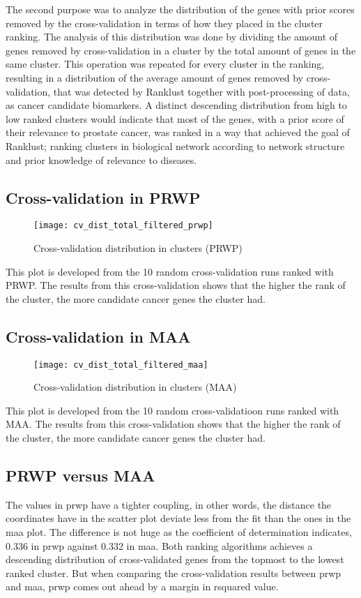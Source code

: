 The second purpose was to analyze the distribution of the genes with prior
scores removed by the cross-validation in terms of how they placed in the
cluster ranking. The analysis of this distribution was done by dividing the
amount of genes removed by cross-validation in a cluster by the total amount of
genes in the same cluster. This operation was repeated for every cluster in the
ranking, resulting in a distribution of the average amount of genes removed by
cross-validation, that was detected by Ranklust together with post-processing of
data, as cancer candidate biomarkers. A distinct descending distribution from
high to low ranked clusters would indicate that most of the genes, with a prior
score of their relevance to prostate cancer, was ranked in a way that achieved
the goal of Ranklust; ranking clusters in biological network according to
network structure and prior knowledge of relevance to diseases.

\subsection{Cross-validation in PRWP}
\begin{figure}[H]
    \label{fig:irefweb-prwp}
    \texttt{[image: cv\_dist\_total\_filtered\_prwp]}
    \caption{Cross-validation distribution in clusters (PRWP)}
\end{figure}
This plot is developed from the 10 random cross-validation runs ranked with
PRWP. The results from this cross-validation shows that the higher the rank of
the cluster, the more candidate cancer genes the cluster had.

\subsection{Cross-validation in MAA}
\begin{figure}[H]
    \label{fig:irefweb-maa}
    \texttt{[image: cv\_dist\_total\_filtered\_maa]}
    \caption{Cross-validation distribution in clusters (MAA)}
\end{figure}
This plot is developed from the 10 random cross-validatioon runs ranked with
MAA.  The results from this cross-validation shows that the higher the rank of
the cluster, the more candidate cancer genes the cluster had.

\subsection{PRWP versus MAA}
The values in \gls{prwp} have a tighter coupling, in other words, the distance
the coordinates have in the scatter plot deviate less from the fit than the ones
in the \gls{maa} plot. The difference is not huge as the coefficient of
determination indicates, 0.336 in \gls{prwp} against 0.332 in \gls{maa}. Both
ranking algorithms achieves a descending distribution of cross-validated genes
from the topmost to the lowest ranked cluster. But when comparing the
cross-validation results between \gls{prwp} and \gls{maa}, \gls{prwp} comes out
ahead by a margin in \gls{rsquared} value.

